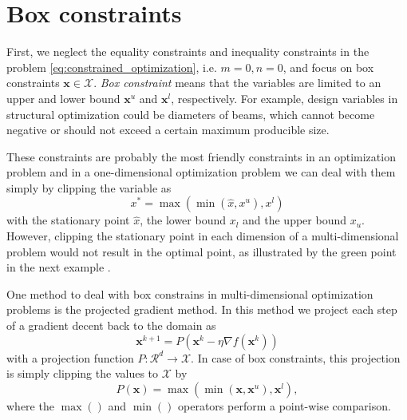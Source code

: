 \section{Box constraints} 
First, we neglect the equality constraints and inequality constraints in the problem \eqref{eq:constrained_optimization}, i.e. $m=0, n=0$, and focus on box constraints $\mathbf{x} \in \mathcal{X}$. \emph{Box constraint} means that the variables are limited to an upper and lower bound $\mathbf{x}^u$ and $\mathbf{x}^l$, respectively. For example, design variables in structural optimization could be diameters of beams, which cannot become negative or should not exceed a certain maximum producible size.

These constraints are probably the most friendly constraints in an optimization problem and in a one-dimensional optimization problem we can deal with them simply by clipping the variable as 
\begin{equation}
    x^* = \max(\min(\hat{x}, x^u), x^l)
\end{equation}
with the stationary point $\hat{x}$, the lower bound $x_l$ and the upper bound $x_u$. However, clipping the stationary point in each dimension of a multi-dimensional problem would not result in the optimal point, as illustrated by the green point in the next example \cite{Niculae2020}.

One method to deal with box constrains in multi-dimensional optimization problems is the projected gradient method. In this method we project each step of a gradient decent back to the domain as 
\begin{equation}
    \mathbf{x}^{k+1} = P(\mathbf{x}^k -\eta \nabla f(\mathbf{x}^k))
\end{equation}
with a projection function $P: \mathcal{R}^d \rightarrow \mathcal{X}$. In case of box constraints, this projection is simply clipping the values to $\mathcal{X}$ by 
\begin{equation}
    P(\mathbf{x}) = \max(\min(\mathbf{x}, \mathbf{x}^u), \mathbf{x}^l),
\end{equation}
where the $\max()$ and $\min()$ operators perform a point-wise comparison. 

